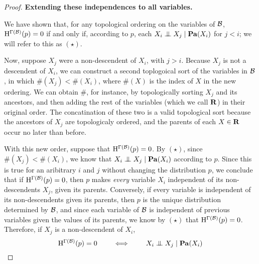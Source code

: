 \documentclass{article}
\def\Pa{\mathbf{Pa}}
\begin{document}
\begin{proof}
	\textbf{Extending these independences to all variables.}
	
	We have shown that, for any topological ordering on the variables of $\cal B$, $\mathrm{H}^{\Gamma(\cal B)}(p) = 0$ if and only if, according to $p$,  each $X_i \CI X_j \mid \Pa(X_i)$ for $j  < i$; we will refer to this as $(\star)$.
	
	Now, suppose $X_j$ were a non-descendent of $X_i$, with $j > i$. Because $X_j$ is not a descendent of $X_i$, we can construct a second toplogoical sort of the variables in $\cal B$, in which $\#(X_j) < \#(X_i)$, where $\#(X)$ is the index of $X$ in the new ordering. 
	We can obtain $\#$, for instance, by topologically sorting $X_j$ and its ancestors, and then adding the rest of the variables (which we call $\bf R$) in their original order. The concatination of these two is a valid topological sort because the ancestors of $X_j$ are topologicaly ordered, and the parents of each $X \in \bf R$ occur no later than before.
	
	
	With this new order, suppose that $\mathrm{H}^{\Gamma(\cal B)}(p) = 0$. By $(\star)$, since $\#(X_j) < \#(X_i)$, we know that $X_i \CI X_j \mid \Pa(X_i)$ according to $p$. Since this is true for an aribitrary $i$ and $j$ without changing the distribution $p$, we conclude that if $\mathrm{H}^{\Gamma(\cal B)}(p) = 0$, then $p$ makes \emph{every} variable $X_i$ independent of its non-descendents $X_j$, given its parents.
	Conversely, if every variable is independent of its non-descendents given its parents, then $p$ is the unique distribution determined by $\cal B$, and since each variable of $\cal B$ is independent of previous variables given the values of its parents,  we know by $(\star)$ that $\mathrm{H}^{\Gamma(\cal B)}(p) = 0$. Therefore, if $X_j$ is a non-descendent of $X_i$, 
	\[ \H^{\Gamma(\cal B)}(p) = 0 \qquad\iff\qquad X_i \CI X_j \mid \Pa(X_i) \] 
	

\end{proof}
\end{document}

